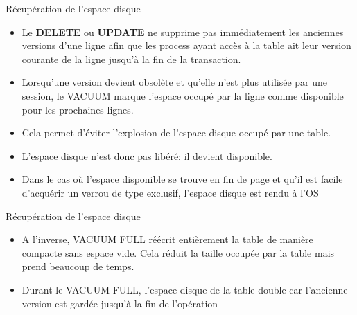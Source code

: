 
\begin{frame}{Récupération de l'espace disque}

   \begin{itemize}
      \item Le \textbf{DELETE} ou \textbf{UPDATE} ne supprime pas immédiatement les anciennes versions d'une ligne afin que les process ayant accès à la table ait leur version courante de la ligne jusqu'à la fin de la transaction.
      \item Lorsqu'une version devient obsolète et qu'elle n'est plus utilisée par une session, le VACUUM marque l'espace occupé par la ligne comme disponible pour les prochaines lignes.
      \item Cela permet d'éviter l'explosion de l'espace disque occupé par une table.
      \item L'espace disque n'est donc pas libéré: il devient disponible.
      \item Dans le cas où l'espace disponible se trouve en fin de page et qu'il est facile d'acquérir un verrou de type exclusif, l'espace disque est rendu à l'OS
   \end{itemize}

\end{frame}


\begin{frame}{Récupération de l'espace disque}

   \begin{itemize}
      \item A l'inverse, VACUUM FULL réécrit entièrement la table de manière compacte sans espace vide. Cela réduit la taille occupée par la table mais prend beaucoup de temps.
      \item Durant le VACUUM FULL, l'espace disque de la table double car l'ancienne version est gardée jusqu'à la fin de l'opération
   \end{itemize}

\end{frame}


